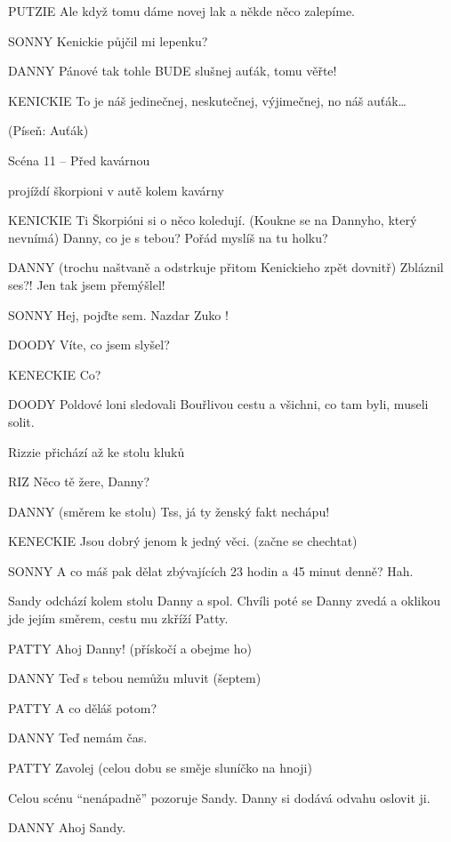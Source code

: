 PUTZIE         Ale když tomu dáme novej lak a někde něco zalepíme. 

SONNY        Kenickie půjčil mi lepenku? 

DANNY         Pánové tak tohle BUDE  slušnej auťák, tomu věřte!

KENICKIE        To je náš jedinečnej, neskutečnej, výjimečnej, no náš auťák…

                 (Píseň: Auťák) 

Scéna 11 – Před kavárnou 

projíždí škorpioni v autě kolem kavárny 

KENICKIE         Ti Škorpióni si o něco koledují. (Koukne se na Dannyho, který nevnímá)                 Danny, co je s tebou? Pořád myslíš na tu holku?

DANNY         (trochu naštvaně a odstrkuje přitom Kenickieho zpět dovnitř) Zbláznil         ses?! Jen tak jsem přemýšlel! 

SONNY         Hej, pojďte sem. Nazdar Zuko !  

DOODY         Víte, co jsem slyšel? 

KENECKIE        Co? 

DOODY         Poldové loni sledovali Bouřlivou cestu a všichni, co tam byli, museli solit. 

Rizzie přichází až ke stolu kluků 

RIZ         Něco tě žere, Danny? 

DANNY        (směrem ke stolu) Tss, já ty ženský fakt nechápu! 

KENECKIE        Jsou dobrý jenom k jedný věci. (začne se chechtat) 

SONNY         A co máš pak dělat zbývajících 23 hodin a 45 minut denně? Hah. 

Sandy odchází kolem stolu Danny a spol. Chvíli poté se Danny zvedá a oklikou jde jejím směrem, cestu mu zkříží Patty. 

PATTY        Ahoj Danny! (přískočí a obejme ho) 

DANNY        Teď s tebou nemůžu mluvit (šeptem) 

PATTY         A co děláš potom? 

DANNY         Teď nemám čas.

PATTY         Zavolej (celou dobu se směje sluníčko na hnoji) 

Celou scénu “nenápadně” pozoruje Sandy. Danny si dodává odvahu oslovit ji. 

DANNY         Ahoj Sandy.

